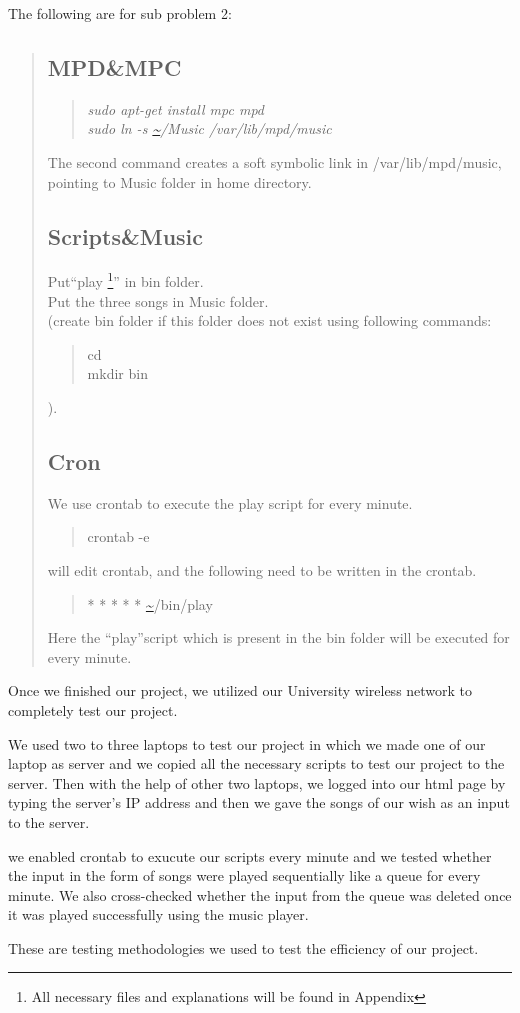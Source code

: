 The following are for sub problem 2:
\begin{quote}
\subsection{MPD\&MPC}
\begin{quote}
\emph{sudo apt-get install mpc mpd} \\
\emph{sudo ln -s \url{~}/Music /var/lib/mpd/music} \\
\end{quote}
The second command creates a soft symbolic link in /var/lib/mpd/music, pointing to Music folder in home directory.
\subsection{Scripts\&Music}
Put``play \footnote{All necessary files and explanations will be found in Appendix}'' in bin folder.\\
Put the three songs in Music folder.\\
(create bin folder if this folder does not exist using following commands:
\begin{quote}
cd\\
mkdir bin
\end{quote}).
\subsection{Cron}
We use crontab to execute the play script for every minute.  
\begin{quote}
crontab -e
\end{quote}
will edit crontab, and the following need to be written in the crontab.
\begin{quote}  
 * * * * * \url{~}/bin/play
\end{quote}
Here the ``play''script which is present in the bin folder will be executed for every minute.
\end{quote}
Once we finished our project, we utilized our University wireless network to completely test our project.

We used two to three laptops to test our project in which we made one of our laptop as server and we copied all the necessary scripts to test our project to the server. Then with the help of other two laptops, we logged into our html page by typing the server's IP address and then we gave the songs of our wish as an input to the server. 

we enabled crontab to exucute our scripts every minute and we tested whether the input in the form of songs were played sequentially like a queue for every  minute. We also cross-checked whether the input from the queue was deleted once it was played successfully using the music player.

 These are testing methodologies we used to test the efficiency of our project.
